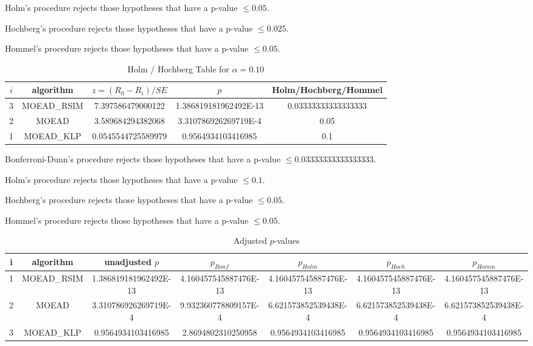 \documentclass[a4paper,10pt]{article}
\begin{document}
\begin{landscape}
Holm's procedure rejects those hypotheses that have a p-value $\le0.05$.


Hochberg's procedure rejects those hypotheses that have a p-value $\le0.025$.


Hommel's procedure rejects those hypotheses that have a p-value $\le0.05$.


\begin{table}[!htp]
\centering\tiny
\caption{Holm / Hochberg Table for $\alpha=0.10$}
\begin{tabular}{ccccc}
$i$&algorithm&$z=(R_0 - R_i)/SE$&$p$&Holm/Hochberg/Hommel\\
\hline
3&MOEAD_RSIM&7.397586479000122&1.386819181962492E-13&0.03333333333333333\\
2&MOEAD&3.589684294382068&3.310786926269719E-4&0.05\\
1&MOEAD_KLP&0.0545544725589979&0.9564934103416985&0.1\\
\hline
\end{tabular}
\end{table}
Bonferroni-Dunn's procedure rejects those hypotheses that have a p-value $\le0.03333333333333333$.


Holm's procedure rejects those hypotheses that have a p-value $\le0.1$.


Hochberg's procedure rejects those hypotheses that have a p-value $\le0.05$.


Hommel's procedure rejects those hypotheses that have a p-value $\le0.05$.


\begin{table}[!htp]
\centering\tiny
\caption{Adjusted $p$-values}
\begin{tabular}{ccccccc}
i&algorithm&unadjusted $p$&$p_{Bonf}$&$p_{Holm}$&$p_{Hoch}$&$p_{Homm}$\\
\hline
1&MOEAD_RSIM&1.386819181962492E-13&4.160457545887476E-13&4.160457545887476E-13&4.160457545887476E-13&4.160457545887476E-13\\
2&MOEAD&3.310786926269719E-4&9.932360778809157E-4&6.621573852539438E-4&6.621573852539438E-4&6.621573852539438E-4\\
3&MOEAD_KLP&0.9564934103416985&2.8694802310250958&0.9564934103416985&0.9564934103416985&0.9564934103416985\\
\hline
\end{tabular}
\end{table}


\end{landscape}
\end{document}
